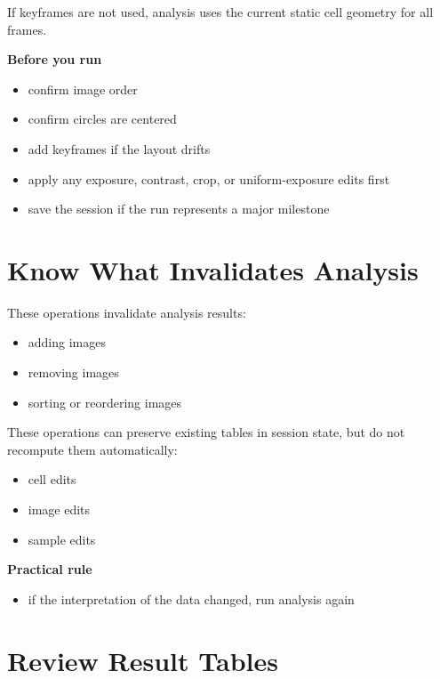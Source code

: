 \documentclass[
  9pt,
  letterpaper,
  oneside,
  open=any,
  DIV=15,
  parskip=half-,
  headings=big,
  numbers=noenddot
]{scrbook}
\newcommand{\manuallead}[1]{%
  \vspace{0.15em}%
  {\sffamily\bfseries\color{ManualBlue}#1}\par\nobreak\vspace{0.05em}%
}
\begin{document}
If keyframes are not used, analysis uses the current static cell geometry for all frames.


\manuallead{Before you run}

\begin{itemize}[leftmargin=*,itemsep=0.35em,topsep=0.4em]
\item confirm image order
\item confirm circles are centered
\item add keyframes if the layout drifts
\item apply any exposure, contrast, crop, or uniform-exposure edits first
\item save the session if the run represents a major milestone
\end{itemize}

\section{Know What Invalidates Analysis}

These operations invalidate analysis results:


\begin{itemize}[leftmargin=*,itemsep=0.35em,topsep=0.4em]
\item adding images
\item removing images
\item sorting or reordering images
\end{itemize}

These operations can preserve existing tables in session state, but do not recompute them automatically:


\begin{itemize}[leftmargin=*,itemsep=0.35em,topsep=0.4em]
\item cell edits
\item image edits
\item sample edits
\end{itemize}

\manuallead{Practical rule}

\begin{itemize}[leftmargin=*,itemsep=0.35em,topsep=0.4em]
\item if the interpretation of the data changed, run analysis again
\end{itemize}

\section{Review Result Tables}
\end{document}
